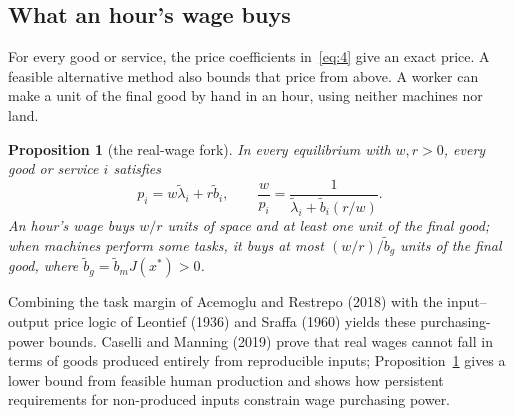 \documentclass[12pt]{article}
\theoremstyle{plain}
\newtheorem{proposition}{Proposition}
\theoremstyle{definition}
\theoremstyle{remark}
\begin{document}
\subsection{What an hour's wage buys}\label{sec:wagebuys}

For every good or service, the price coefficients in~\eqref{eq:4} give an exact price. A feasible alternative method also bounds that price from above.
A worker can make a unit of the final good by hand in an hour, using neither machines nor land.

\begin{proposition}[the real-wage fork]\label{prop:4}
In every equilibrium with $w,r>0$, every good or service $i$ satisfies
\begin{equation}\label{eq:12}
p_i=w\widetilde\lambda_i+r\widetilde b_i,\qquad
\frac{w}{p_i}=\frac{1}{\widetilde\lambda_i+\widetilde b_i(r/w)}.
\end{equation}
An hour's wage buys $w/r$ units of space and at least one unit of the final good; when machines perform some tasks, it buys at most $(w/r)/\widetilde b_g$ units of the final good, where $\widetilde b_g=\widetilde b_mJ(x^*)>0$.
\end{proposition}

Combining the task margin of Acemoglu and Restrepo (2018) with the input--output price logic of Leontief (1936) and Sraffa (1960) yields these purchasing-power bounds.
Caselli and Manning (2019) prove that real wages cannot fall in terms of goods produced entirely from reproducible inputs; Proposition~\ref{prop:4} gives a lower bound from feasible human production and shows how persistent requirements for non-produced inputs constrain wage purchasing power.
\end{document}
